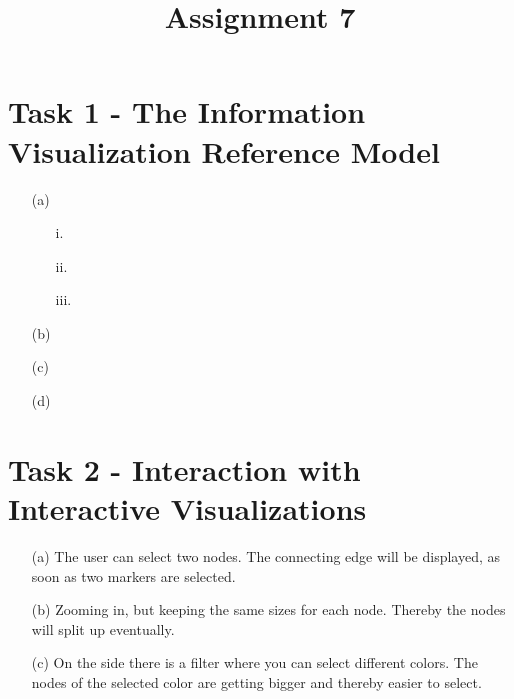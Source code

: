 \documentclass[a4paper]{article}
\date{}
\author{}
\title{\textbf{Assignment 7}}
\begin{document}
\maketitle 
\thispagestyle{fancy}

\section*{Task 1 - The Information Visualization Reference Model}
\begin{enumerate}
	\item[(a)]
		\begin{enumerate}
			\item[i.]
			\item[ii.]
			\item[iii.]
		\end{enumerate}
	\item[(b)]
	\item[(c)]
	\item[(d)]
\end{enumerate}


\section*{Task 2 - Interaction with Interactive Visualizations}
\begin{enumerate}
	\item[(a)]The user can select two nodes. The connecting edge will be displayed, as soon as two markers are selected.
	\item[(b)]Zooming in, but keeping the same sizes for each node. Thereby the nodes will split up eventually.
	\item[(c)]On the side there is a filter where you can select different colors. The nodes of the selected color are getting bigger and thereby easier to select.
\end{enumerate}
\end{document}
